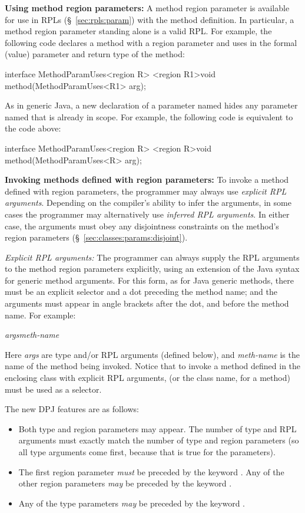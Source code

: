 \noindent
\textbf{Using method region parameters:} A method region parameter is
available for use in RPLs (\S~\ref{sec:rpls:param}) with the method
definition.  In particular, a method region parameter standing alone
is a valid RPL.  For example, the following code declares a method
 with a region parameter  and uses  in the
formal (value) parameter and return type of the method:
%
\begin{dpjlisting}
interface MethodParamUses<region R> {
    <region R1>void method(MethodParamUses<R1> arg);
}
\end{dpjlisting}
%
As in generic Java, a new declaration of a parameter named 
hides any parameter named  that is already in scope.  For
example, the following code is equivalent to the code above:
%
\begin{dpjlisting}
interface MethodParamUses<region R> {
    <region R>void method(MethodParamUses<R> arg);
}
\end{dpjlisting}
%

\noindent
\textbf{Invoking methods defined with region parameters:} To invoke a
method defined with region parameters, the programmer may always use
\emph{explicit RPL arguments}.  Depending on the compiler's ability to
infer the arguments, in some cases the programmer may alternatively
use \emph{inferred RPL arguments}.  In either case, the arguments must
obey any disjointness constraints on the method's region parameters
(\S~\ref{sec:classes:params:disjoint}).

\noindent
\textit{Explicit RPL arguments:} The programmer can always supply the
RPL arguments to the method region parameters explicitly, using an
extension of the Java syntax for generic method arguments.  For this
form, as for Java generic methods, there must be an explicit selector
and a dot preceding the method name; and the arguments must appear in
angle brackets after the dot, and before the method name.  For
example:
%
\begin{description}
\item {}\emph{args}\kwd{>}\emph{meth-name}\kwd{()}
\end{description}
%
Here \emph{args} are type and/or RPL arguments (defined below), and
\emph{meth-name} is the name of the method being invoked.  Notice that
to invoke a method defined in the enclosing class with explicit RPL
arguments,  (or the class name, for a  method)
must be used as a selector.

The new DPJ features are as follows:
%
\begin{itemize}
%
\item Both type and region parameters may appear.  The number of type
  and RPL arguments must exactly match the number of type and region
  parameters (so all type arguments come first, because that is true
  for the parameters).
%
\item The first region parameter \emph{must} be preceded by the
  keyword .  Any of the other region parameters \emph{may}
  be preceded by the keyword .
%
\item Any of the type parameters \emph{may} be preceded by the keyword
  .
%
\end{itemize}
%

